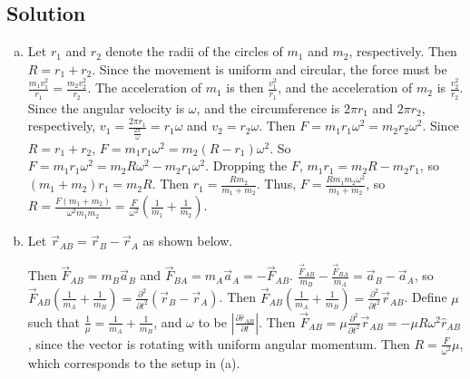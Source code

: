 \documentclass[solutions]{esg8012pset}
\begin{document}
\subsection*{Solution}
  \begin{enumerate}[a)]
    \item Let $r_1$ and $r_2$ denote the radii of the circles of $m_1$ and $m_2$, respectively.  Then $R = r_1 + r_2$.  Since the movement is uniform and circular, the force must be $\frac{m_1 v_1^2}{r_1} = \frac{m_2 v_2^2}{r_2}$.  The acceleration of $m_1$ is then $\frac{v_1^2}{r_1}$, and the acceleration of $m_2$ is $\frac{v_2^2}{r_2}$.  Since the angular velocity is $\omega$, and the circumference is $2\pi r_1$ and $2\pi r_2$, respectively, $v_1 = \frac{2\pi r_1}{\frac{2\pi}{\omega}} = r_1 \omega$ and $v_2 = r_2 \omega$.  Then $F = m_1 r_1 \omega^2 =  m_2 r_2 \omega^2$.  Since $R = r_1 + r_2$, $F = m_1 r_1 \omega^2 = m_2 (R - r_1) \omega^2$.  So $F = m_1 r_1 \omega^2 = m_2 R \omega^2 - m_2 r_1 \omega^2$.  Dropping the $F$, $m_1 r_1 = m_2 R - m_2 r_1$, so $(m_1 + m_2)r_1 = m_2 R$.  Then $r_1 = \frac{R m_2}{m_1 + m_2}$.  Thus, $F =  \frac{R m_1 m_2\omega^2}{m_1 + m_2}$, so $R = \frac{F(m_1+m_2)}{\omega^2 m_1 m_2} = \frac{F}{\omega^2}\left(\frac{1}{m_1}+\frac{1}{m_2}\right)$.
    \item Let $\vec r_{AB} = \vec r_B - \vec r_A$ as shown below.
      \begin{center}
      \end{center}
      Then $\vec F_{AB} = m_B \vec a_B$ and $\vec F_{BA} = m_A \vec a_A = -\vec F_{AB}$.  $\frac{\vec F_{AB}}{m_B} - \frac{\vec F_{BA}}{m_A} = \vec a_B - \vec a_A$, so $\vec F_{AB}\left(\frac{1}{m_A} + \frac{1}{m_B}\right) = \frac{\partial^2}{\partial t^2}(\vec r_B - \vec r_A)$.  Then $\vec F_{AB}\left(\frac{1}{m_A} + \frac{1}{m_B}\right) = \frac{\partial^2}{\partial t^2}\vec r_{AB}$.  Define $\mu$ such that $\frac{1}{\mu} = \frac{1}{m_A} + \frac{1}{m_B}$, and $\omega$ to be $\left\vert \frac{\partial \hat r_{AB}}{\partial t}\right\vert$.  Then $\vec F_{AB} = \mu \frac{\partial^2}{\partial t^2}\vec r_{AB} = -\mu R\omega^2\hat r_{AB}$, since the vector is rotating with uniform angular momentum.  Then $R = \frac{F}{\omega^2}\mu$, which corresponds to the setup in (a).
  \end{enumerate}
\end{document}

